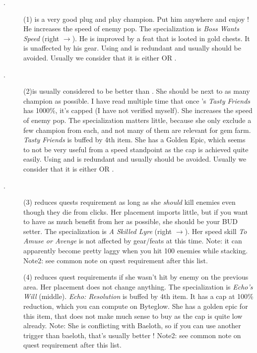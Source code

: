 \documentclass{article}
\begin{document}
\begin{description}
    \item[\deekin.] (1) \deekin is a very good plug and play champion.
    Put him anywhere and enjoy !
    He increases the speed of enemy pop.
    The specialization is \textit{Boss Wants Speed} (right $\rightarrow$).
    He is improved by a feat that is looted in gold chests.
    It is unaffected by his gear.
    Using \deekin and \widdle is redundant and usually should be avoided.
    Usually we consider that it is either \deekin OR \widdle.
    
    \item[\widdle.] (2)\widdle is usually considered to be better than \deekin.
    She should be next to as many champion as possible.
    I have read multiple time that once \widdle's \textit{Tasty Friends} has 1000\%, it's capped (I have not verified myself).
    She increases the speed of enemy pop.
    The specialization matters little, because she only exclude a few champion from each, and not many of them are relevant for gem farm.
    \textit{Tasty Friends} is buffed by \widdle 4th item.
    She has a Golden Epic, which seems to not be very useful from a speed standpoint as the cap is achieved quite easily.
    Using \deekin and \widdle is redundant and usually should be avoided.
    Usually we consider that it is either \deekin OR \widdle.
    
    \item[\nahara.] (3) \nahara reduces quests requirement as long as she \textit{should} kill enemies even though they die from clicks.
    Her placement imports little, but if you want to have as much benefit from her as possible, she should be your BUD setter.
    The specialization is \textit{A Skilled Lyre} (right $\rightarrow$).
    Her speed skill \textit{To Amuse or Avenge} is not affected by gear/feats at this time.
    Note: it can apparently become pretty laggy when you hit 100 enemies while stacking.
    Note2: see common note on quest requirement after this list.
    
    \item[\sentry] (4) \sentry reduces quest requirements if she wasn't hit by enemy on the previous area.
    Her placement does not change anything.
    The specialization is \textit{Echo's Will} (middle).
    \textit{Echo: Resolution} is buffed by \sentry 4th item.
    It has a cap at 100\% reduction, which you can compute on Byteglow.
    She has a golden epic for this item, that does not make much sense to buy as the cap is quite low already.
    Note: She is conflicting with Baeloth, so if you can use another trigger than baeloth, that's usually better !
    Note2: see common note on quest requirement after this list.
    

\end{description}
\end{document}
